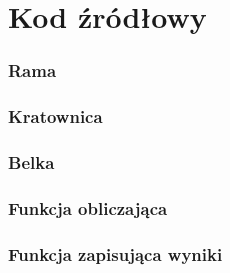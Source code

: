 \chapter{Kod źródłowy}
\subsection*{Rama}
\label{appendix:Rama}

\newpage

\subsection*{Kratownica}
\label{appendix:Kratownica}

\newpage

\subsection*{Belka}
\label{appendix:Belka}

\newpage

\subsection*{Funkcja obliczająca}
\label{appendix:Obliczenia}

\newpage

\subsection*{Funkcja zapisująca wyniki}
\label{appendix:Zapis}
